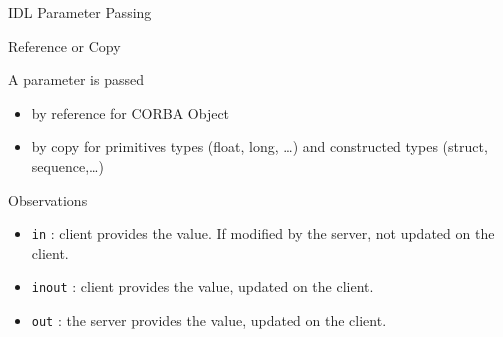\documentclass[bigger,hyperref={colorlinks=true, urlcolor=red, plainpages=false, pdfpagelabels, bookmarksnumbered}]{beamer}
\begin{document}
\begin{frame}[fragile,label=sec-4-12]{IDL Parameter Passing}
 \begin{block}{Reference or Copy}


A parameter is passed
\begin{itemize}
\item by reference for CORBA Object
\item by copy for primitives types (float, long, \ldots{}) and constructed types (struct, sequence,\ldots{})
\end{itemize}
\end{block}

\begin{block}{Observations}
\begin{itemize}
\item \texttt{in} : client provides the value. If modified by the server, not updated on the client.
\item \texttt{inout} :  client provides the value, updated on the client.
\item \texttt{out} : the server provides the value, updated on the client.
\end{itemize}
\end{block}
\end{frame}
\end{document}
